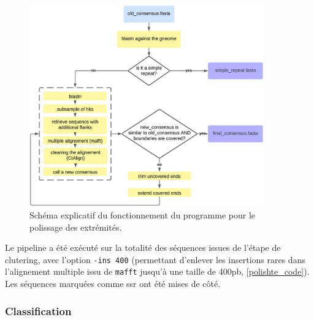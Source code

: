 \documentclass[10pt]{article}
\begin{document}
\bigskip

\begin{figure}[H]
    \centering
    \includegraphics[width=0.9\textwidth]{img/misc/polishte.eps}
    \caption{Schéma explicatif du fonctionnement du programme pour le polissage des extrémités.}
    \label{fig:polishte}
\end{figure}

\bigskip

Le pipeline a été exécuté sur la totalité des séquences issues de l'étape de clutering, avec l'option \texttt{-ins 400} (permettant d'enlever les insertions rares dans l'alignement multiple issu de \texttt{mafft} jusqu'à une taille de 400pb, \autoref{polishte_code}). Les séquences marquées comme \acrshort{ssr} ont été mises de côté.

\subsubsection{Classification}\label{sec:classif_sec}
\end{document}
